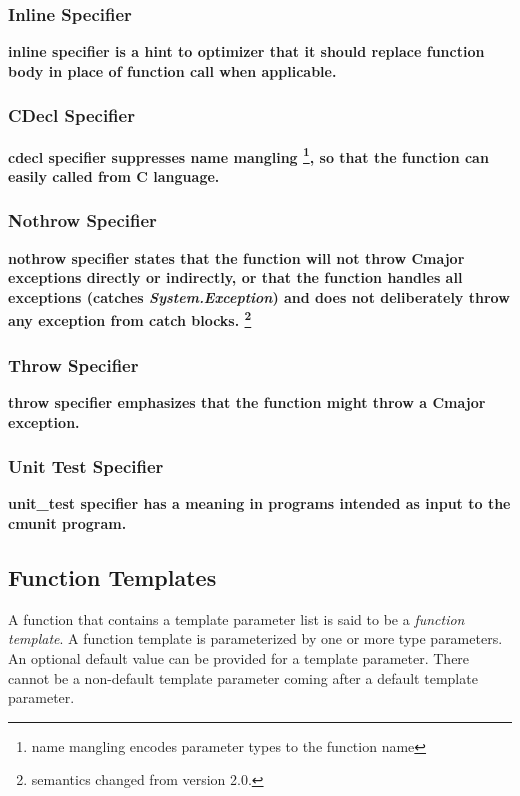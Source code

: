 \documentclass[a4paper,oneside,11pt]{article}
\begin{document}
\subsubsection{Inline Specifier}

\bf{inline} specifier is a hint to optimizer that
it should replace function body in place of function call when applicable.

\subsubsection{CDecl Specifier}

\bf{cdecl} specifier suppresses name mangling \footnote{name mangling encodes parameter types to the function name},
so that the function can easily called from C language.

\subsubsection{Nothrow Specifier}

\bf{nothrow} specifier states that the function will not throw Cmajor exceptions directly or indirectly,
or that the function handles all exceptions (catches \emph{System.Exception})
and does not deliberately throw any exception from catch blocks. \footnote{semantics changed from version 2.0.}

\subsubsection{Throw Specifier}

\bf{throw} specifier emphasizes that the function might throw a Cmajor exception.

\subsubsection{Unit Test Specifier}

\bf{unit\_test} specifier has a meaning in programs intended as input to the \bf{cmunit} program.

\subsection{Function Templates}

A function that contains a template parameter list is said to be a \emph{function template}.
A function template is parameterized by one or more type parameters.
An optional default value can be provided for a template parameter. There cannot be a non-default
template parameter coming after a default template parameter.
\end{document}
